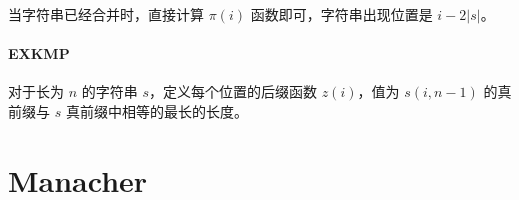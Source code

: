 \documentclass{probook}
\begin{document}
\begin{multicols}{2}
当字符串已经合并时，直接计算 $\pi(i)$ 函数即可，字符串出现位置是 $i-2|s|$。



\paragraph{EXKMP}

对于长为 $n$ 的字符串 $s$，定义每个位置的后缀函数 $z(i)$，值为 $s(i,n-1)$ 的真前缀与 $s$ 真前缀中相等的最长的长度。



\section{Manacher}





\end{multicols}
\end{document}

